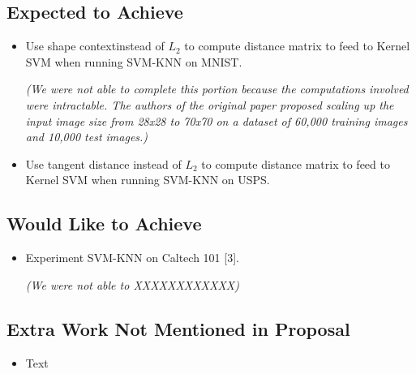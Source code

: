 \documentclass[11pt,letterpaper]{article}
\begin{document}
\subsection{Expected to Achieve}
\begin{itemize}
\item Use shape contextinstead of $L_2$ to compute distance matrix to feed to Kernel SVM when running SVM-KNN on MNIST. 

\textit{(We were not able to complete this portion because the computations involved were intractable. The authors of the original paper proposed scaling up the input image size from 28x28 to 70x70 on a dataset of 60,000 training images and 10,000 test images.)}
\item Use tangent distance instead of $L_2$ to compute distance matrix to feed to Kernel SVM when running SVM-KNN on USPS.
\end{itemize}

\subsection{Would Like to Achieve}
\begin{itemize}
\item Experiment SVM-KNN on Caltech 101 [3]. 

\textit{(We were not able to XXXXXXXXXXXX)}
\end{itemize}

\subsection{Extra Work Not Mentioned in Proposal}

\begin{itemize}
\item Text

\end{itemize}
\end{document}
